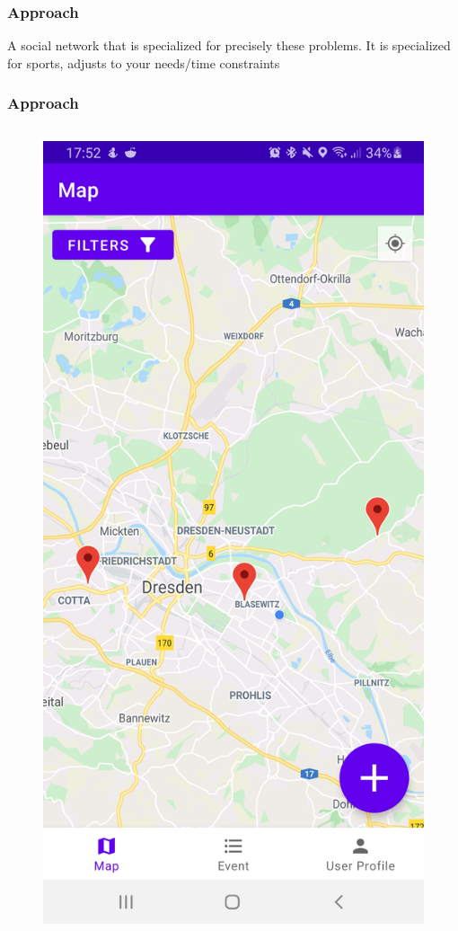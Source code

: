 \documentclass[aspectratio=169]{beamer}
\begin{document}
	\begin{frame}
		\frametitle{Approach}
		A social network that is specialized for precisely these problems. It is specialized for sports, adjusts to your needs/time constraints 
	\end{frame}

	\begin{frame}   
		\frametitle{Approach}
		\begin{columns}
			 \begin{figure}
				\centering
				\includegraphics[width=1\textwidth]{media/Map.jpg}

\end{figure}
\end{columns}
\end{frame}
\end{document}
